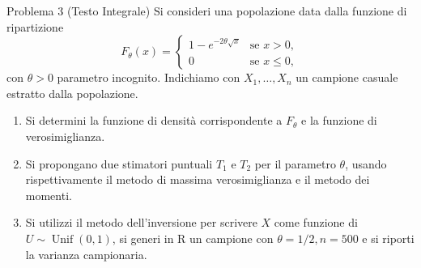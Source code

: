 \documentclass[11pt,a4paper]{article}
\begin{document}
\begin{problemabox}{Problema 3 (Testo Integrale)}
Si consideri una popolazione data dalla funzione di ripartizione
\[
F_\theta(x) = \begin{cases}
1 - e^{-2\theta\sqrt{x}} & \text{se } x > 0, \\
0 & \text{se } x \le 0,
\end{cases}
\]
con $\theta > 0$ parametro incognito. Indichiamo con $X_1, \dots, X_n$ un campione casuale estratto dalla popolazione.
\begin{enumerate}[label=(\roman*)]
    \item Si determini la funzione di densità corrispondente a $F_\theta$ e la funzione di verosimiglianza.
    \item Si propongano due stimatori puntuali $T_1$ e $T_2$ per il parametro $\theta$, usando rispettivamente il metodo di massima verosimiglianza e il metodo dei momenti.
    \item Si utilizzi il metodo dell'inversione per scrivere $X$ come funzione di $U \sim \operatorname{Unif}(0,1)$, si generi in R un campione con $\theta=1/2, n=500$ e si riporti la varianza campionaria.
\end{enumerate}
\end{problemabox}
\end{document}
